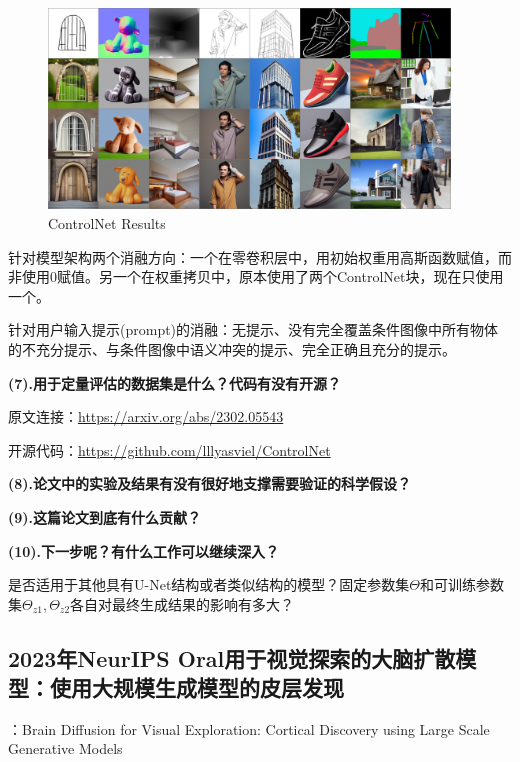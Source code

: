 \documentclass[12pt, a4paper, oneside]{ctexart}
\begin{document}
    \begin{figure}[htbp]
        \centering
        \includegraphics[width=0.95\textwidth]{pic/4.10_ControlNetResults.jpg}
        \caption{ControlNet Results}
        \label{ControlNetResults}
    \end{figure}


    针对模型架构两个消融方向：一个在零卷积层中，用初始权重用高斯函数赋值，而非使用$0$赋值。另一个在权重拷贝中，原本使用了两个ControlNet块，现在只使用一个。

    针对用户输入提示(prompt)的消融：无提示、没有完全覆盖条件图像中所有物体的不充分提示、与条件图像中语义冲突的提示、完全正确且充分的提示。

    \noindent\textbf{(7).用于定量评估的数据集是什么？代码有没有开源？}

    原文连接：\url{https://arxiv.org/abs/2302.05543}

    开源代码：\url{https://github.com/lllyasviel/ControlNet}

    \noindent\textbf{(8).论文中的实验及结果有没有很好地支撑需要验证的科学假设？}



    \noindent\textbf{(9).这篇论文到底有什么贡献？}



    \noindent\textbf{(10).下一步呢？有什么工作可以继续深入？}

    是否适用于其他具有U-Net结构或者类似结构的模型？固定参数集$\Theta$和可训练参数集$\Theta_{z1},\Theta_{z2}$各自对最终生成结果的影响有多大？


    \subsection{2023年NeurIPS Oral用于视觉探索的大脑扩散模型：使用大规模生成模型的皮层发现\cite{luo2023brain}}
     ：Brain Diffusion for Visual Exploration: Cortical Discovery using Large Scale Generative Models
\end{document}
